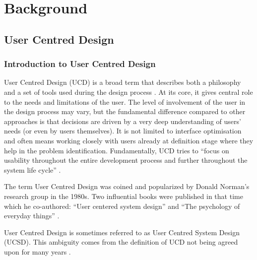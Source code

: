 
\chapter{Background}


	\section{User Centred Design}

		\subsection{Introduction to User Centred Design}

User Centred Design (UCD) is a broad term that describes both a philosophy and a set of tools used during the design process \citep{norman1986user, norman2013design}. At its core, it gives central role to the needs and limitations of the user. The level of involvement of the user in the design process may vary, but the fundamental difference compared to other approaches is that decisions are driven by a very deep understanding of users’ needs (or even by users themselves). It is not limited to interface optimisation and often means working closely with users already at definition stage where they help in the problem identification. Fundamentally, UCD tries to “focus on usability throughout the entire development process and further throughout the system life cycle” \citep{Gulliksen2003}.

The term User Centred Design was coined and popularized by Donald Norman’s research group in the 1980s. Two influential books were published in that time which he co-authored: “User centered system design” \citep{norman1986user} and “The psychology of everyday things” \citep{norman1988design}.

User Centred Design is sometimes referred to as User Centred System Design (UCSD). This ambiguity comes from the definition of UCD not being agreed upon for many years \citep{Gulliksen2003}.

